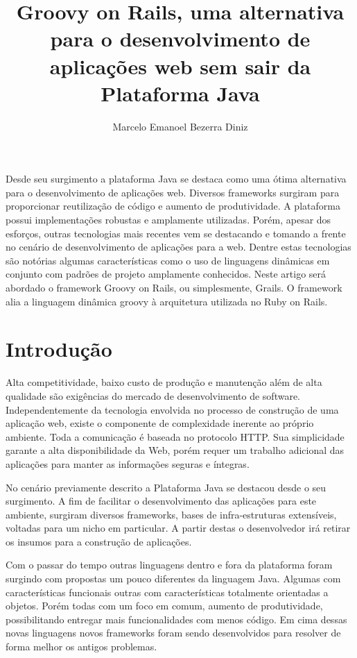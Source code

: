 \documentclass[12pt]{article}
\title{Groovy on Rails, uma alternativa para o desenvolvimento de aplicações web sem sair da Plataforma Java}
\author{Marcelo Emanoel Bezerra Diniz\inst{1}}
\begin{document}
 

\maketitle

\begin{resumo} 
    Desde seu surgimento a plataforma Java se destaca como uma ótima alternativa para o desenvolvimento de aplicações web.
    Diversos frameworks surgiram para proporcionar reutilização de código e aumento de produtividade. A plataforma possui 
    implementações robustas e amplamente utilizadas. Porém, apesar dos esforços, outras tecnologias mais recentes vem se 
    destacando e tomando a frente no cenário de desenvolvimento de aplicações para a web. Dentre estas tecnologias são notórias
    algumas características como o uso de linguagens dinâmicas em conjunto com padrões de projeto amplamente conhecidos.
    Neste artigo será abordado o framework Groovy on Rails, ou simplesmente, Grails. O framework alia a linguagem dinâmica groovy
    à arquitetura utilizada no Ruby on Rails. 
\end{resumo}

\section{Introdução}
    Alta competitividade, baixo custo de produção e manutenção além de alta qualidade são exigências do mercado de desenvolvimento
    de software. Independentemente da tecnologia envolvida no processo de construção de uma aplicação web, existe o componente de 
    complexidade inerente ao próprio ambiente. Toda a comunicação é baseada no protocolo HTTP. Sua simplicidade garante a alta 
    disponibilidade da Web, porém requer um trabalho adicional das aplicações para manter as informações seguras e íntegras.

    No cenário previamente descrito a Plataforma Java se destacou desde o seu surgimento. A fim de facilitar o desenvolvimento
    das aplicações para este ambiente, surgiram diversos frameworks, bases de infra-estruturas extensíveis, voltadas para um nicho
    em particular. A partir destas o desenvolvedor irá retirar os insumos para a construção de aplicações.

    Com o passar do tempo outras linguagens dentro e fora da plataforma foram surgindo com propostas um pouco diferentes da 
    linguagem Java. Algumas com características funcionais outras com características totalmente orientadas a objetos. Porém 
    todas com um foco em comum, aumento de produtividade, possibilitando entregar mais funcionalidades com menos código. Em cima 
    dessas novas linguagens novos frameworks foram sendo desenvolvidos para resolver de forma melhor os antigos problemas.
    
\end{document}
